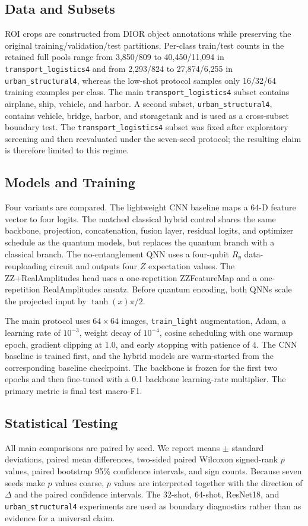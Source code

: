 \documentclass[journal]{IEEEtran}
\newcommand{\TL}{\texttt{transport\_logistics4}}
\newcommand{\URB}{\texttt{urban\_structural4}}
\begin{document}
\subsection{Data and Subsets}
ROI crops are constructed from DIOR object annotations while preserving the original training/validation/test partitions. Per-class train/test counts in the retained full pools range from 3,850/809 to 40,450/11,094 in \TL{} and from 2,293/824 to 27,874/6,255 in \URB{}, whereas the low-shot protocol samples only 16/32/64 training examples per class. The main \TL{} subset contains airplane, ship, vehicle, and harbor. A second subset, \URB{}, contains vehicle, bridge, harbor, and storagetank and is used as a cross-subset boundary test. The \TL{} subset was fixed after exploratory screening and then reevaluated under the seven-seed protocol; the resulting claim is therefore limited to this regime.

\subsection{Models and Training}
Four variants are compared. The lightweight CNN baseline maps a 64-D feature vector to four logits. The matched classical hybrid control shares the same backbone, projection, concatenation, fusion layer, residual logits, and optimizer schedule as the quantum models, but replaces the quantum branch with a classical branch. The no-entanglement QNN uses a four-qubit $R_y$ data-reuploading circuit and outputs four $Z$ expectation values. The ZZ+RealAmplitudes head uses a one-repetition ZZFeatureMap and a one-repetition RealAmplitudes ansatz. Before quantum encoding, both QNNs scale the projected input by $\tanh(x)\pi/2$.

The main protocol uses $64\times64$ images, \texttt{train\_light} augmentation, Adam, a learning rate of $10^{-3}$, weight decay of $10^{-4}$, cosine scheduling with one warmup epoch, gradient clipping at 1.0, and early stopping with patience of 4. The CNN baseline is trained first, and the hybrid models are warm-started from the corresponding baseline checkpoint. The backbone is frozen for the first two epochs and then fine-tuned with a 0.1 backbone learning-rate multiplier. The primary metric is final test macro-F1.

\subsection{Statistical Testing}
All main comparisons are paired by seed. We report means $\pm$ standard deviations, paired mean differences, two-sided paired Wilcoxon signed-rank $p$ values, paired bootstrap 95\% confidence intervals, and sign counts. Because seven seeds make $p$ values coarse, $p$ values are interpreted together with the direction of $\Delta$ and the paired confidence intervals. The 32-shot, 64-shot, ResNet18, and \URB{} experiments are used as boundary diagnostics rather than as evidence for a universal claim.
\end{document}
